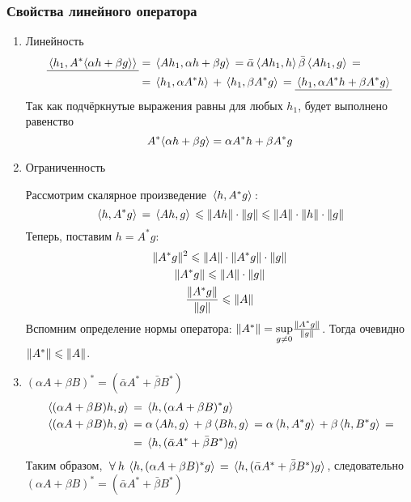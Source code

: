 \documentclass[12pt]{article}
\begin{document}
	\subsubsection{Свойства линейного оператора}
	
	\begin{enumerate}
		\item Линейность
		\begin{align*}
			\underline{ \, \langle h_1, A^{*}\langle \alpha h + \beta g \rangle \rangle \, } &= \, \langle Ah_1, \alpha h + \beta g \rangle \, = 
			\bar{\alpha}\, \langle Ah_1, h \rangle \, \bar{\beta}\, \langle Ah_1, g \rangle \, = \\
			&= \, \langle h_1, \alpha A^{*} h \rangle \, + \, \langle h_1, \beta A^{*} g \rangle \, = 
			\underline{ \, \langle h_1, \alpha A^{*} h + \beta A^{*} g \rangle \, }
		\end{align*}
		Так как подчёркнутые выражения равны для любых $h_1$, будет выполнено равенство
		$$A^{*}\langle \alpha h + \beta g \rangle = \alpha A^{*} h + \beta A^{*} g$$
		
		\item Ограниченность \label{bounded}
		
		Рассмотрим скалярное произведение $\, \langle h, A^{*}g \rangle \,$: 
		$$\, \langle h, A^{*}g \rangle \, = \, \langle Ah, g \rangle \, \leqslant \| Ah \|\cdot\| g \| \leqslant \| A \|\cdot\| h \|\cdot\| g \|$$
		Теперь, поставим $h = A^{*}g$:
		\begin{gather*}
			\| A^{*}g \|^2 \leqslant \| A \|\cdot\| A^{*}g \|\cdot\| g \| \\
			\| A^{*}g \| \leqslant \| A \|\cdot\| g \| \\
			\dfrac{\| A^{*}g \|}{\| g \|} \leqslant \| A \|
		\end{gather*}
		Вспомним определение нормы оператора: $\| A^{*} \| = \underset{g \neq 0}{\sup} \frac{\| A^{*}g \|}{\| g \|}$. Тогда очевидно
		$\| A^{*} \| \leqslant \| A \|$.
		
		\item $(\alpha A + \beta B)^{*} = (\bar{\alpha}A^{*} + \bar{\beta}B^{*})$ \label{conjlin}
		\begin{align*}
			\, \langle (\alpha A + \beta B)h, g \rangle \, &= \, \langle h, (\alpha A + \beta B)^{*}g \rangle \, \\
			\, \langle (\alpha A + \beta B)h, g \rangle \, &= \alpha\, \langle Ah, g \rangle \, + \beta\, \langle Bh, g \rangle \, 
			= \alpha\, \langle h, A^{*}g \rangle \, + \beta \, \langle h, B^{*}g \rangle \, = \\
			&= \, \langle h, (\bar{\alpha}A^{*} + \bar{\beta}B^{*})g \rangle \,
		\end{align*}
		Таким образом, $\forall h\: \scal{h}{(\alpha A + \beta B)^{*}g} = \scal{h}{(\bar{\alpha}A^{*} + \bar{\beta}B^{*})g}$, 
		следовательно $(\alpha A + \beta B)^{*} = (\bar{\alpha}A^{*} + \bar{\beta}B^{*})$ \\
		

\end{enumerate}
\end{document}
